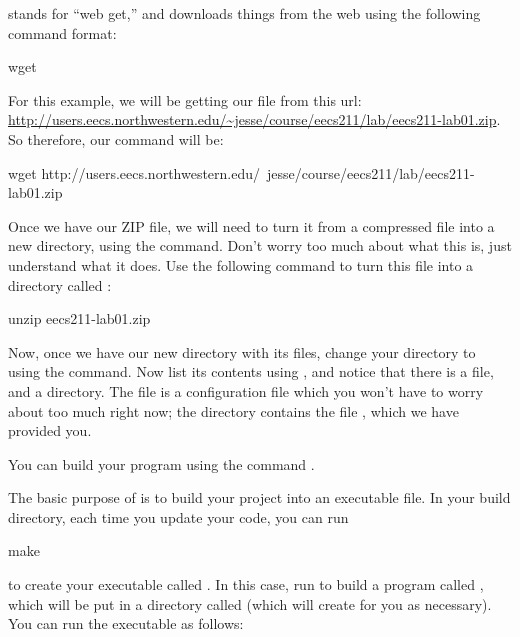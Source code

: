 \documentclass{tufte-handout}
\begin{document}
 stands for ``web get,'' and downloads things from the web using the
following command format:

\begin{CmdLine}
  \prompt wget 
\end{CmdLine}

\noindent
For this example, we will be getting our file from this url:
\url{http://users.eecs.northwestern.edu/~jesse/course/eecs211/lab/eecs211-lab01.zip}.
So therefore, our command will be:

\begin{CmdLine}
  \prompt wget http://users.eecs.northwestern.edu/~jesse/course/eecs211/lab/eecs211-lab01.zip
\end{CmdLine}

Once we have our ZIP file, we will need to turn it from a compressed
file into a new directory, using the  command.
Don't worry too much
about what this is, just understand what it does.  Use the following
command to turn this file into a directory called
:

\begin{CmdLine}
  \prompt unzip eecs211-lab01.zip
\end{CmdLine}

Now, once we have our new directory with its files, change your
directory to  using the  command.
Now list its contents using , and notice that there is a
 file, and a  directory. The
 file is a  configuration file which
you won't have to worry about too much right now; the 
directory contains the file , which we have provided
you.

You can build your program using the command .

The basic purpose of  is to build your project into an
executable file. In your build directory, each time you update your
code, you can run

\begin{CmdLine}
  \prompt make 
\end{CmdLine}

\noindent to create your executable called .  In
this case, run  to build a program called
, which will be put in a directory called
 (which  will create for you as
necessary). You can run the executable as follows:
\end{document}
